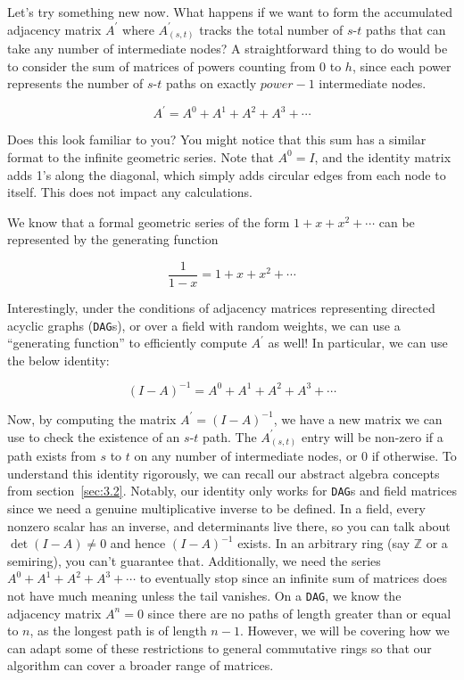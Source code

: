 \documentclass[12pt]{article}
\begin{document}
Let's try something new now. What happens if we want to form the accumulated adjacency matrix $A^{\prime}$ where $A^{\prime}_{(s, t)}$ tracks the total number of $s$-$t$ paths that can take any number of intermediate nodes? A straightforward thing to do would be to consider the sum of matrices of powers counting from 0 to $h$, since each power represents the number of $s$-$t$ paths on exactly $power - 1$ intermediate nodes.

\[
    A^{\prime} = A^0 + A^1 + A^2 + A^3 + \cdots
\]

Does this look familiar to you? You might notice that this sum has a similar format to the infinite geometric series. Note that $A^0 = I$, and the identity matrix adds 1's along the diagonal, which simply adds circular edges from each node to itself. This does not impact any calculations.

We know that a formal geometric series of the form $1 + x + x^2 + \cdots$ can be represented by the generating function

\[
    \frac{1}{1 - x} = 1 + x + x^2 + \cdots
\]

Interestingly, under the conditions of adjacency matrices representing directed acyclic graphs (\texttt{DAG}s), or over a field with random weights, we can use a ``generating function'' to efficiently compute $A^{\prime}$ as well! In particular, we can use the below identity:

\[
    (I - A)^{-1} = A^0 + A^1 + A^2 + A^3 + \cdots
\]

Now, by computing the matrix $A^{\prime} = (I - A)^{-1}$, we have a new matrix we can use to check the existence of an $s$-$t$ path. The $A^{\prime}_{(s, t)}$ entry will be non-zero if a path exists from $s$ to $t$ on any number of intermediate nodes, or $0$ if otherwise. To understand this identity rigorously, we can recall our abstract algebra concepts from section~\ref{sec:3.2}. Notably, our identity only works for \texttt{DAG}s and field matrices since we need a genuine multiplicative inverse to be defined. In a field, every nonzero scalar has an inverse, and determinants live there, so you can talk about $\det(I - A)\neq 0$ and hence $(I - A)^{-1}$ exists.  In an arbitrary ring (say \(\mathbb Z\) or a semiring), you can't guarantee that. Additionally, we need the series $A^0 + A^1 + A^2 + A^3 + \cdots$ to eventually stop since an infinite sum of matrices does not have much meaning unless the tail vanishes. On a \texttt{DAG}, we know the adjacency matrix $A^n = 0$ since there are no paths of length greater than or equal to $n$, as the longest path is of length $n - 1$. However, we will be covering how we can adapt some of these restrictions to general commutative rings so that our algorithm can cover a broader range of matrices.
\end{document}
